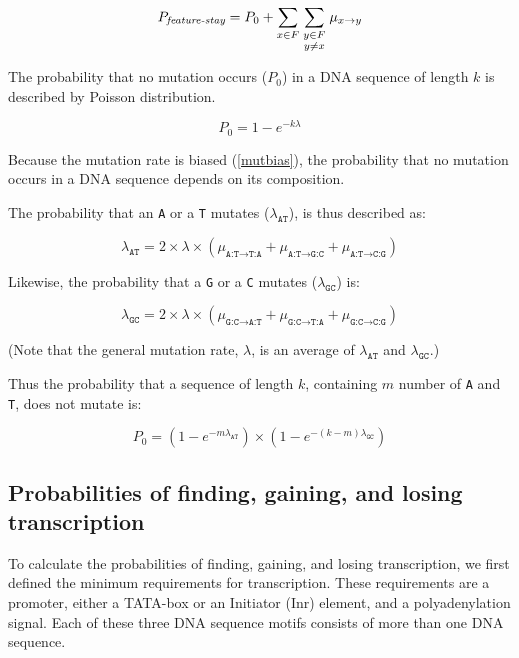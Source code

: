 \documentclass[12pt,a4paper]{article}
\begin{document}
\begin{equation}
P_\textit{feature-stay} = P_0 + \sum_{x \in F} \sum_{\genfrac{}{}{0pt}{1}{y \in F}{y\neq x}} \mu_{x\to y}
\end{equation}


The probability that no mutation occurs ($P_0$) in a DNA sequence of length $k$ is described by Poisson distribution. 

$$P_0 = 1-e^{-k\lambda}$$

Because the mutation rate is biased (\autoref{mutbias}), the probability that no mutation occurs in a DNA sequence depends on its composition. 

The probability that an \texttt{A} or a \texttt{T} mutates ($\lambda_\texttt{AT}$), is thus described as:

$$\lambda_\texttt{AT} = 2\times\lambda\times(\mu_{\texttt{A:T}\to\texttt{T:A}} + \mu_{\texttt{A:T}\to\texttt{G:C}} + \mu_{\texttt{A:T}\to\texttt{C:G}})$$

Likewise, the probability that a \texttt{G} or a \texttt{C} mutates ($\lambda_\texttt{GC}$) is: 

\vspace{-1ex}

$$\lambda_\texttt{GC} = 2\times\lambda\times(\mu_{\texttt{G:C}\to\texttt{A:T}} + \mu_{\texttt{G:C}\to\texttt{T:A}} + \mu_{\texttt{G:C}\to\texttt{C:G}})$$

(Note that the general mutation rate, $\lambda$, is an average of $\lambda_\texttt{AT}$ and $\lambda_\texttt{GC}$.)

\vspace{1\baselineskip}

Thus the probability that a sequence of length $k$, containing $m$ number of \texttt{A} and \texttt{T}, does not mutate is:

\vspace{-1ex}

$$P_0 = (1-e^{-m\lambda_\texttt{AT}})\times(1-e^{-(k-m)\lambda_\texttt{GC}})$$

\subsection{Probabilities of finding, gaining, and losing transcription}

To calculate the probabilities of finding, gaining, and losing transcription, we first defined the minimum requirements for transcription. These requirements are a promoter, either a TATA-box or an Initiator (Inr) element, and a polyadenylation signal. Each of these three DNA sequence motifs consists of more than one DNA sequence.
\end{document}
